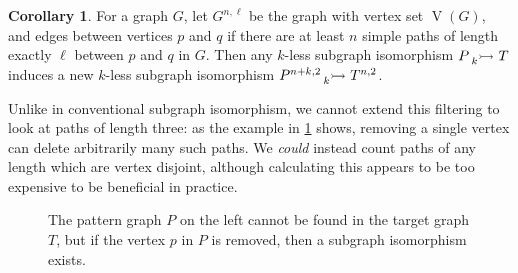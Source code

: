 \documentclass[letterpaper]{article}
\theoremstyle{definition}
\newtheorem{corollary}{Corollary}
\newcommand{\lessnonind}[1]{\prescript{}{#1}{\rightarrowtail}\ }
\newcommand{\V}{\operatorname{V}}
\begin{document}
\begin{corollary}
    For a graph $G$, let $G^{n, \ell}$ be the graph with vertex set $\V(G)$, and edges between vertices $p$ and $q$ if there are at least $n$ simple paths of
    length exactly $\ell$ between $p$ and $q$ in $G$. Then any $k$-less subgraph isomorphism
    $P \lessnonind{k} T$ induces a new $k$-less subgraph isomorphism
    $P^{n+k, 2}\lessnonind{k} T^{n, 2}$.
\end{corollary}

Unlike in conventional subgraph isomorphism, we cannot extend this filtering to look at paths of
length three: as the example in \cref{figure:pathlength3example} shows, removing a single vertex can
delete arbitrarily many such paths. We \emph{could} instead count paths of any length which are
vertex disjoint, although calculating this appears to be too expensive to be beneficial in practice.

\begin{figure}[tb]
    \centering
    \caption{The pattern graph $P$ on the left cannot be found in the target graph $T$, but if
    the vertex $p$ in $P$ is removed, then a subgraph isomorphism exists.}
    \label{figure:pathlength3example}
\end{figure}
\end{document}
